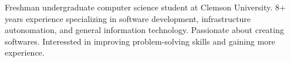 

\begin{cvparagraph}

Freshman undergraduate computer science student at Clemson University. 8+ years experience specializing in software development, infrastructure autonomation, and general information technology. Passionate about creating softwares. Interessted in improving problem-solving skills and gaining more experience.

\end{cvparagraph}

